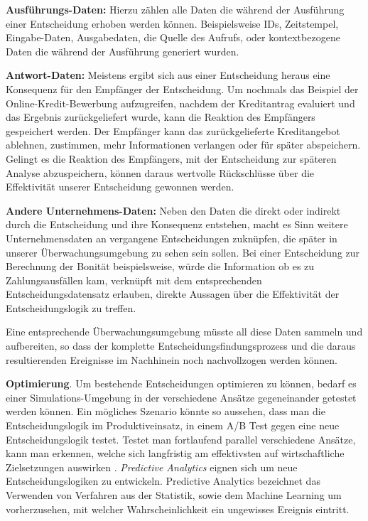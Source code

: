 \begin{enumerate*}
\item \textbf{Ausführungs-Daten:} Hierzu zählen alle Daten die während der Ausführung einer Entscheidung erhoben werden können. Beispielsweise IDs, Zeitstempel, Eingabe-Daten, Ausgabedaten, die Quelle des Aufrufs, oder kontextbezogene Daten die während der Ausführung generiert wurden.   
\item \textbf{Antwort-Daten:} Meistens ergibt sich aus einer Entscheidung heraus eine Konsequenz für den Empfänger der Entscheidung. Um nochmals das Beispiel der Online-Kredit-Bewerbung aufzugreifen, nachdem der Kreditantrag evaluiert und das Ergebnis zurückgeliefert wurde, kann die Reaktion des Empfängers gespeichert werden. Der Empfänger kann das zurückgelieferte Kreditangebot ablehnen, zustimmen, mehr Informationen verlangen oder für später abspeichern. Gelingt es die Reaktion des Empfängers, mit der Entscheidung zur späteren Analyse abzuspeichern, können daraus wertvolle Rückschlüsse über die Effektivität unserer Entscheidung gewonnen werden.     
\item \textbf{Andere Unternehmens-Daten:} Neben den Daten die direkt oder indirekt durch die Entscheidung und ihre Konsequenz entstehen, macht es Sinn weitere Unternehmensdaten an vergangene Entscheidungen zuknüpfen, die später in unserer Überwachungsumgebung zu sehen sein sollen. Bei einer Entscheidung zur Berechnung der Bonität beispielsweise, würde die Information ob es zu Zahlungsausfällen kam, verknüpft mit dem entsprechenden Entscheidungsdatensatz erlauben, direkte Aussagen über die Effektivität der Entscheidungslogik zu treffen.       
\end{enumerate*}         

Eine entsprechende Überwachungsumgebung müsste all diese Daten sammeln und aufbereiten, so dass der komplette Entscheidungsfindungsprozess und die daraus resultierenden Ereignisse im Nachhinein noch nachvollzogen werden können.

\textbf{Optimierung}. Um bestehende Entscheidungen optimieren zu können, bedarf es einer Simulations-Umgebung in der verschiedene Ansätze gegeneinander getestet werden können. Ein mögliches Szenario könnte so aussehen, dass man die Entscheidungslogik im Produktiveinsatz, in einem A/B Test gegen eine neue Entscheidungslogik testet. Testet man fortlaufend parallel verschiedene Ansätze, kann man erkennen, welche sich langfristig am effektivsten auf wirtschaftliche Zielsetzungen auswirken \cite[vgl. S. 173]{JT11}. \emph{Predictive Analytics} eignen sich um neue Entscheidungslogiken zu entwickeln. Predictive Analytics bezeichnet \cite[vgl. S. 5]{BG15} das Verwenden von Verfahren aus der Statistik, sowie dem Machine Learning um vorherzusehen, mit welcher Wahrscheinlichkeit ein ungewisses Ereignis eintritt.   



